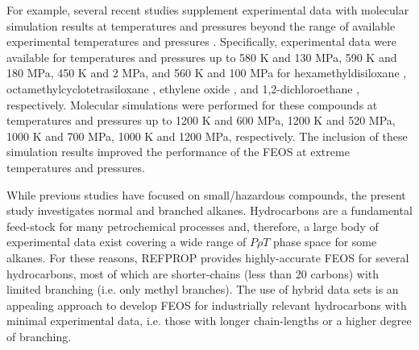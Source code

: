 \documentclass[preprint,letterpaper,floatfix,citeautoscript,aip,jcp]{revtex4-1}
\begin{document}
For example, several recent studies supplement experimental data with molecular simulation results at temperatures and pressures beyond the range of available experimental temperatures and pressures \cite{Thol2016_siloxane_first,Thol2016_siloxane,Thol2017,Thol2015}. Specifically, experimental data were available for temperatures and pressures up to 580 K and 130 MPa, 590 K and 180 MPa, 450 K and 2 MPa, and 560 K and 100 MPa for hexamethyldisiloxane \cite{Thol2016_siloxane_first}, octamethylcyclotetrasiloxane \cite{Thol2016_siloxane}, ethylene oxide \cite{Thol2015}, and 1,2-dichloroethane \cite{Thol2017}, respectively. Molecular simulations were performed for these compounds at temperatures and pressures up to 1200 K and 600 MPa, 1200 K and 520 MPa, 1000 K and 700 MPa, 1000 K and 1200 MPa, respectively. The inclusion of these simulation results improved the performance of the FEOS at extreme temperatures and pressures. 

% 

While previous studies have focused on small/hazardous compounds, the present study investigates normal and branched alkanes. Hydrocarbons are a fundamental feed-stock for many petrochemical processes and, therefore, a large body of experimental data exist covering a wide range of $P \rho T$ phase space for some alkanes. For these reasons, REFPROP provides highly-accurate FEOS for several hydrocarbons, most of which are shorter-chains (less than 20 carbons) with limited branching (i.e. only methyl branches). The use of hybrid data sets is an appealing approach to develop FEOS for industrially relevant hydrocarbons with minimal experimental data, i.e. those with longer chain-lengths or a higher degree of branching.


\end{document}
